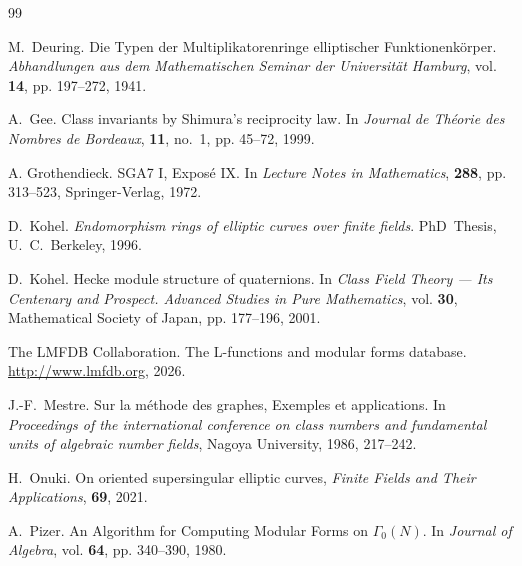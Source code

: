 \documentclass{amsart}
\begin{document}
\begin{thebibliography}{99}
%

M.~Deuring.
  Die Typen der Multiplikatorenringe elliptischer Funktionenk\"orper.
  {\it Abhandlungen aus dem Mathematischen Seminar der Universit\"{a}t Hamburg}, vol. {\bf 14}, pp. 197--272, 1941.

  A.~Gee.
  Class invariants by Shimura's reciprocity law.
  In {\it Journal de Th{\'e}orie des Nombres de Bordeaux},
  {\bf 11}, no.~1, pp. 45--72, 1999.

  A. Grothendieck. SGA7 I, Expos\'e IX.
  In {\it Lecture Notes in Mathematics}, {\bf 288}, pp. 313--523, Springer-Verlag, 1972.

  D.~Kohel.
  {\it Endomorphism rings of elliptic curves over finite fields}.
  PhD~Thesis, U.~C.~Berkeley, 1996.
  
  D.~Kohel.
  Hecke module structure of quaternions.
  In {\it Class Field Theory --- Its Centenary and Prospect. Advanced Studies in Pure Mathematics}, vol. {\bf 30}, Mathematical Society of Japan, pp. 177--196, 2001.
  
The LMFDB Collaboration.
The L-functions and modular forms database.
\url{http://www.lmfdb.org}, 2026.

J.-F.~Mestre.
  Sur la m\'ethode des graphes, Exemples et applications.
  In {\it Proceedings of the international conference on class numbers and fundamental units of algebraic number fields},
  Nagoya University, 1986, 217--242.
  
  H.~Onuki.
  On oriented supersingular elliptic curves,
  {\it Finite Fields and Their Applications},
  {\bf 69}, 2021.


A.~Pizer. 
An Algorithm for Computing Modular Forms on $\Gamma_0(N)$.
In {\it Journal of Algebra}, vol. {\bf 64}, pp. 340--390, 1980.


\end{thebibliography}
\end{document}
